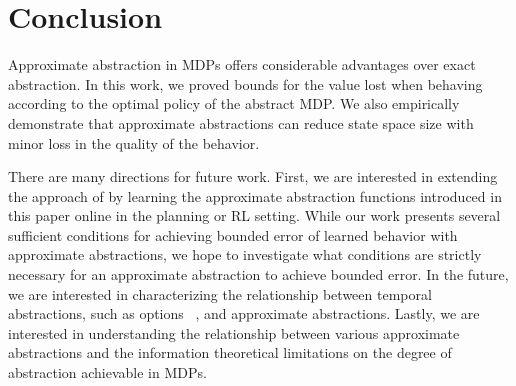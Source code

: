 \section{Conclusion}

Approximate abstraction in \acp{MDP} offers considerable advantages over exact abstraction. In this work, we proved bounds for the value lost when behaving according to the optimal policy of the abstract \ac{MDP}. We also empirically demonstrate that approximate abstractions can reduce state space size with minor loss in the quality of the behavior.


There are many directions for future work.
First, we are interested in extending the approach of \citet{ortner2013adaptive} by learning the approximate abstraction functions introduced in this paper online in the planning or \ac{RL} setting.
While our work presents several sufficient conditions for achieving bounded error of learned behavior with approximate abstractions, we hope to investigate what conditions are strictly necessary for an approximate abstraction to achieve bounded error.
In the future, we are interested in characterizing the relationship between temporal abstractions, such as options ~\cite{sutton1999between}, and approximate abstractions.
Lastly, we are interested in understanding the relationship between various approximate abstractions and the information theoretical limitations on the degree of abstraction achievable in \acp{MDP}.

